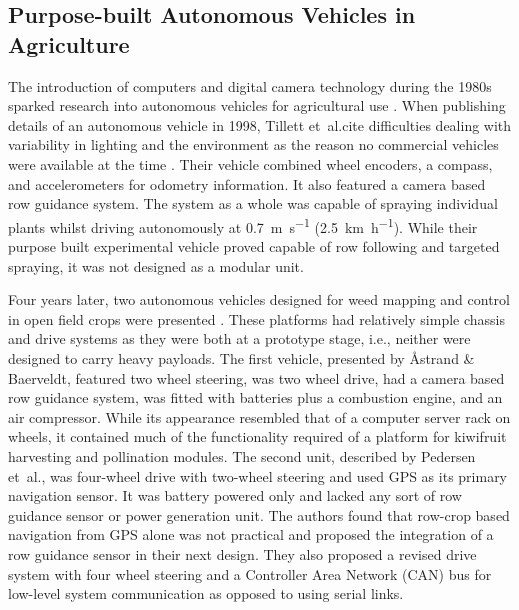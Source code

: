 \documentclass[preprint,authoryear,12pt]{elsarticle}
\begin{document}
    \subsection{Purpose-built Autonomous Vehicles in Agriculture}

        The introduction of computers and digital camera technology during the 1980s sparked research into autonomous vehicles for agricultural use \citep{Li2009}.
        When publishing details of an autonomous vehicle in 1998, Tillett et~al.\@ cite difficulties dealing with variability in lighting and the environment as the reason no commercial vehicles were available at the time \citep{Tillett1998}.
        Their vehicle combined wheel encoders, a compass, and accelerometers for odometry information.
        It also featured a camera based row guidance system.
        The system as a whole was capable of spraying individual plants whilst driving autonomously at \SI{0.7}{\meter\per\second} (\SI{2.5}{\kilo\meter\per\hour}).
        While their purpose built experimental vehicle proved capable of row following and targeted spraying, it was not designed as a modular unit.




        Four years later, two autonomous vehicles designed for weed mapping and control in open field crops were presented \citep{Pedersen2002,Astrand2002}.
        These platforms had relatively simple chassis and drive systems as they were both at a prototype stage, i.e., neither were designed to carry heavy payloads.
        The first vehicle, presented by Åstrand \& Baerveldt, featured two wheel steering, was two wheel drive, had a camera based row guidance system, was fitted with batteries plus a combustion engine, and an air compressor.
        While its appearance resembled that of a computer server rack on wheels, it contained much of the functionality required of a platform for kiwifruit harvesting and pollination modules.
        The second unit, described by Pedersen et~al.\@, was four-wheel drive with two-wheel steering and used GPS as its primary navigation sensor.
        It was battery powered only and lacked any sort of row guidance sensor or power generation unit.
        The authors found that row-crop based navigation from GPS alone was not practical and proposed the integration of a row guidance sensor in their next design.
        They also proposed a revised drive system with four wheel steering and a Controller Area Network (CAN) bus for low-level system communication as opposed to using serial links.
\end{document}
